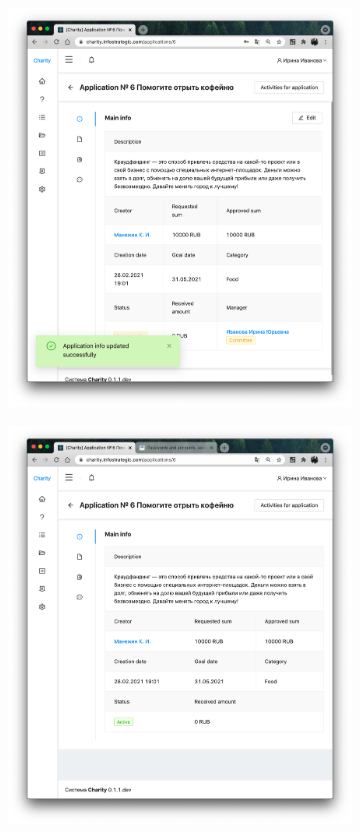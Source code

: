 \documentclass[a4paper,12pt,reqno]{article}
\begin{document}
\begin{figure}[H]
\begin{subfigure}[b]{0.475\linewidth}
		\end{subfigure}
		\begin{subfigure}[b]{0.475\linewidth}
			\includegraphics[width=\linewidth]{img/test/3.png}
		\end{subfigure}
		\begin{subfigure}[b]{0.475\linewidth}
			\includegraphics[width=\linewidth]{img/test/4.png}

\end{subfigure}
\end{figure}
\end{document}
